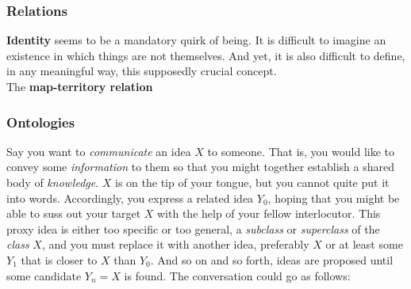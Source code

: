 \subsubsection{Relations}



\textbf{Identity} seems to be a mandatory quirk of being. It is difficult to imagine an existence in which things are not themselves. And yet, it is also difficult to define, in any meaningful way, this supposedly crucial concept. \\



The \textbf{map-territory relation} \\




\subsubsection{Ontologies}


Say you want to \textit{communicate} an idea $X$ to someone. That is, you would like to convey some \textit{information} to them so that you might together establish a shared body of \textit{knowledge}. $X$ is on the tip of your tongue, but you cannot quite put it into words. Accordingly, you express a related idea $Y_0$, hoping that you might be able to suss out your target $X$ with the help of your fellow interlocutor. This proxy idea is either too specific or too general, a \textit{subclass} or \textit{superclass} of the \textit{class} $X$, and you must replace it with another idea, preferably $X$ or at least some $Y_1$ that is closer to $X$ than $Y_0$. And so on and so forth, ideas are proposed until some candidate $Y_n=X$ is found. The conversation could go as follows: \\\\

